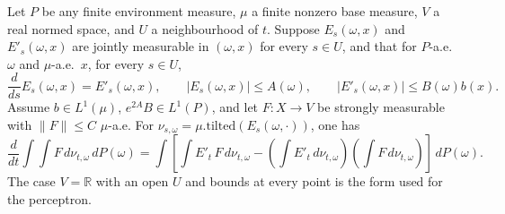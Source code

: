 \begin{theorem}\label{thm:sg-tal:perceptron-expected-tilt-response}
  \leanok
Let $P$ be any finite environment measure, $\mu$ a finite nonzero base measure, $V$ a real normed space,
and $U$ a neighbourhood of $t$. Suppose $E_s(\omega,x)$ and $E'_s(\omega,x)$
are jointly measurable in $(\omega,x)$ for every $s\in U$, and that for $P$-a.e.\ $\omega$ and $\mu$-a.e.\ $x$,
for every $s\in U$,
\[
 \frac d{ds}E_s(\omega,x)=E'_s(\omega,x),\qquad
 |E_s(\omega,x)|\le A(\omega),\qquad
 |E'_s(\omega,x)|\le B(\omega)b(x).
\]
Assume $b\in L^1(\mu)$, $e^{2A}B\in L^1(P)$, and let $F:X\to V$ be strongly measurable with $\|F\|\le C$
$\mu$-a.e.
For $\nu_{s,\omega}=\mu.\mathrm{tilted}(E_s(\omega,\cdot))$, one has
\[
 \frac d{dt}\int\!\int F\,d\nu_{t,\omega}\,dP(\omega)
 =\int\left[\int E'_t\,F\,d\nu_{t,\omega}
   -\left(\int E'_t\,d\nu_{t,\omega}\right)
    \left(\int F\,d\nu_{t,\omega}\right)\right]\,dP(\omega).
\]
The case $V=\mathbb R$ with an open $U$ and bounds at every point is the form used for the perceptron.
\end{theorem}
